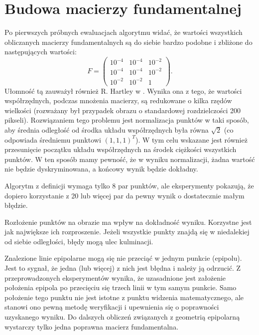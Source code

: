

\section{Budowa macierzy fundamentalnej}

Po pierwszych próbnych ewaluacjach algorytmu \cite{eight_point} widać, że
wartości wszystkich obliczanych macierzy fundamentalnych są do siebie bardzo
podobne i zbliżone do następujących wartości: \begin{equation} F =
  \begin{pmatrix} 10^{-4} & 10^{-4} & 10^{-2} \\ 10^{-4} & 10^{-4} & 10^{-2} \\
    10^{-2} & 10^{-2} & 1 \end{pmatrix}.  \end{equation} Ułomność tą zauważył
    również R. Hartley w \cite{defence_8pt}. Wynika ona z tego, że wartości
    współrzędnych, podczas mnożenia macierzy, są redukowane o kilka rzędów
    wielkości (rozważany był przypadek obrazu o standardowej rozdzielczości 200
    pikseli). Rozwiązaniem tego problemu jest normalizacja punktów w taki
    sposób, aby średnia odległość od środka układu współrzędnych była równa
    $\sqrt{2}$ (co odpowiada średniemu punktowi $(1,1,1)^T$). W tym celu
    wskazane jest również przesunięcie początku układu współrzędnych na środek
    ciężkości wszystkich punktów. W ten sposób mamy pewność, że w wyniku
    normalizacji, żadna wartość nie będzie dyskryminowana, a końcowy wynik
    będzie dokładny.

Algorytm \cite{eight_point} z definicji wymaga tylko 8 par punktów, ale
eksperymenty pokazują, że dopiero korzystanie z 20 lub więcej par da pewny
wynik o dostatecznie małym błędzie. 


Rozłożenie punktów na obrazie ma wpływ na dokładność wyniku. Korzystne jest jak
największe ich rozproszenie. Jeżeli wszystkie punkty znajdą się w niedalekiej
od siebie odległości, błędy mogą ulec kulminacji.

Znalezione linie epipolarne mogą się nie przeciąć w jednym punkcie (epipolu).
Jest to sygnał, że jedna (lub więcej) z nich jest błędna i należy ją odrzucić.
Z przeprowadzonych eksperymentów wynika, że uzasadnione jest założenie
położenia epipola po przecięciu się trzech linii w tym samym punkcie. Samo
położenie tego punktu nie jest istotne z punktu widzenia matematycznego, ale
stanowi ono pewną metodę weryfikacji i upewnienia się o poprawności uzyskanego
wyniku. Do dalszych obliczeń związanych z geometrią epipolarną wystarczy tylko
jedna poprawna macierz fundamentalna.

